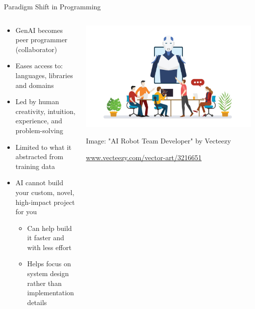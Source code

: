 \documentclass[xcolor={dvipsnames,table}, aspectratio=169]{beamer}
\begin{document}
\begin{frame}{Paradigm Shift in Programming}
  \begin{columns}
    \begin{column}{0.6\textwidth}
      \begin{itemize}
        \item GenAI becomes peer programmer (collaborator)
        \item Eases access to: languages, libraries and domains
        \item Led by human creativity, intuition, experience, and problem-solving
        \item Limited to what it abstracted from training data
        \item AI cannot build your custom, novel, high-impact project for you
        \begin{itemize}
            \item Can help build it faster and with less effort
            \item Helps focus on system design rather than implementation details
          \end{itemize}
      \end{itemize}
    
    \end{column}
    
    \begin{column}{0.4\textwidth}
      \includegraphics[width=\textwidth]{images/376_generated.jpg}
      \tiny\centerline{Image: "AI Robot Team Developer" by Vecteezy}
      \tiny\centerline{\url{www.vecteezy.com/vector-art/3216651}}
    \end{column}
  \end{columns}
\end{frame}
\end{document}
